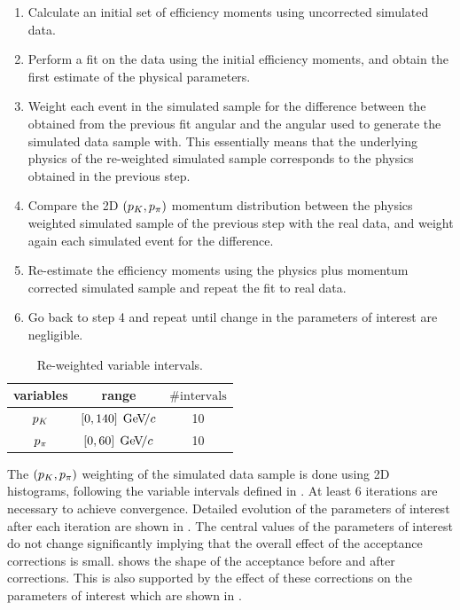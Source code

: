 \begin{enumerate}
\item Calculate an initial set of efficiency moments using uncorrected \BsJpsiKst simulated data.
\item Perform a fit on the \BsJpsiKst data using the initial efficiency moments, and obtain the first estimate of the physical parameters.
\item Weight each event in the simulated sample for the difference between the obtained from the previous fit angular \pdf and the angular \pdf used to
      generate the simulated data sample with.
      This essentially means that the underlying physics of the re-weighted simulated  sample corresponds to the physics obtained in the previous step.
\item Compare the 2D $(p_K,p_\pi)$ momentum distribution between the physics weighted simulated sample of the previous step with the
      real data, and weight again each simulated event for the difference.
\item Re-estimate the efficiency moments using the physics plus momentum corrected \BsJpsiKst simulated sample and repeat the fit to \BsJpsiKst real data.
\item Go back to step 4 and repeat until change in the parameters of interest are negligible.
\end{enumerate}

\begin{table}[!h]
  \center
  \begin{tabular}{c c c}
    \hline
     variables & range & $\# \text{intervals}$ \\
    \hline
    $p_K$    &  $[0,140] \; {\mathrm{\,Ge\kern -0.1em V\!/}c}$  & 10      \\
    $p_\pi$    &  $[0,60]  \; {\mathrm{\,Ge\kern -0.1em V\!/}c}$  & 10      \\
    \hline
  \end{tabular}
  \caption{\small Re-weighted variable intervals.}
  \label{angAccBinning}
\end{table}

The $(p_K,p_\pi)$ weighting of the simulated data sample is done using 2D histograms, following the variable intervals defined in .
At least 6 iterations are necessary to achieve convergence. Detailed evolution of the parameters of interest after each iteration are shown in
. The central values of the parameters of interest do not change significantly implying that the overall effect of the
acceptance corrections is small.  shows the shape of the acceptance before and after corrections.
This is also supported by the effect of these corrections on the parameters of interest which are shown in .

